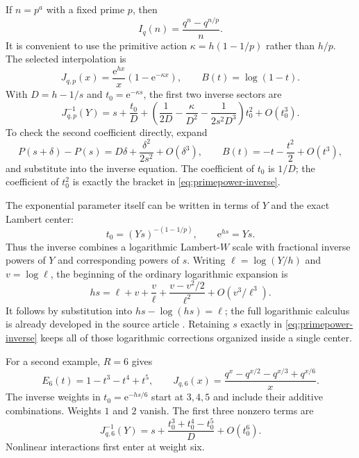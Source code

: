 \documentclass[11pt]{article}
\numberwithin{equation}{section}
\theoremstyle{definition}
\newcommand{\ee}{\mathrm e}
\begin{document}
If $n=p^a$ with a fixed prime $p$, then
\[
 I_q(n)=\frac{q^n-q^{n/p}}n.
\]
It is convenient to use the primitive action
$\kappa=h(1-1/p)$ rather than $h/p$. The selected interpolation is
\begin{equation}\label{eq:primepower-interp}
 J_{q,p}(x)=\frac{\ee^{hx}}x(1-\ee^{-\kappa x}),
 \qquad B(t)=\log(1-t).
\end{equation}
With $D=h-1/s$ and $t_0=\ee^{-\kappa s}$, the first two inverse sectors are
\begin{equation}\label{eq:primepower-inverse}
 \boxed{\displaystyle
 J_{q,p}^{-1}(Y)=s+\frac{t_0}{D}
 +\left(\frac1{2D}-\frac{\kappa}{D^2}
              -\frac1{2s^2D^3}\right)t_0^2+O(t_0^3).}
\end{equation}
To check the second coefficient directly, expand
\[
 P(s+\delta)-P(s)=D\delta+\frac{\delta^2}{2s^2}+O(\delta^3),
 \qquad B(t)=-t-\frac{t^2}{2}+O(t^3),
\]
and substitute into the inverse equation. The coefficient of $t_0$ is $1/D$; the coefficient of $t_0^2$ is exactly the bracket in \eqref{eq:primepower-inverse}.

The exponential parameter itself can be written in terms of $Y$ and the exact Lambert center:
\begin{equation}\label{eq:primepower-scale}
 t_0=(Ys)^{-(1-1/p)},\qquad \ee^{hs}=Ys.
\end{equation}
Thus the inverse combines a logarithmic Lambert-$W$ scale with fractional inverse powers of $Y$ and corresponding powers of $s$. Writing
$\ell=\log(Y/h)$ and $v=\log\ell$, the beginning of the ordinary logarithmic expansion is
\begin{equation}\label{eq:W-logexpansion}
 hs=\ell+v+\frac v\ell+\frac{v-v^2/2}{\ell^2}
       +O(v^3/\ell^3).
\end{equation}
It follows by substitution into $hs-\log(hs)=\ell$; the full logarithmic calculus is already developed in the source article \cite{base}. Retaining $s$ exactly in \eqref{eq:primepower-inverse} keeps all of those logarithmic corrections organized inside a single center.

For a second example, $R=6$ gives
\begin{equation}\label{eq:R6}
 E_6(t)=1-t^3-t^4+t^5,
 \qquad
 J_{q,6}(x)=\frac{q^x-q^{x/2}-q^{x/3}+q^{x/6}}x.
\end{equation}
The inverse weights in $t_0=\ee^{-hs/6}$ start at $3,4,5$ and include their additive combinations. Weights $1$ and $2$ vanish. The first three nonzero terms are
\begin{equation}\label{eq:R6-first}
 J_{q,6}^{-1}(Y)=s+\frac{t_0^3+t_0^4-t_0^5}{D}+O(t_0^6).
\end{equation}
Nonlinear interactions first enter at weight six.
\end{document}
